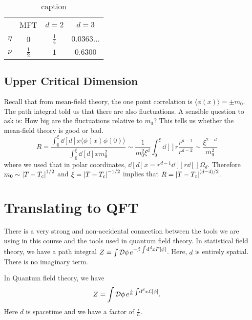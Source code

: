 \begin{table}[htpb]
  \centering
  \begin{tabular}{|c|c|c|c|}
     & MFT & $d = 2$ & $d = 3$ \\
    $\eta$ & 0 & $\frac{1}{4}$ & $0.0363\dots$ \\
    $\nu$ & $\frac{1}{2}$ & $1$ & $0.6300$ \\
  \end{tabular}
  \caption{caption}
  \label{tab:label}
\end{table}


\subsection{Upper Critical Dimension}%
\label{sub:upper_critical_dimension}

Recall that from mean-field theory, the one point correlation is $\langle \phi(x) \rangle = \pm m_0$. The path integral told us that there are also fluctuations. 
A sensible question to ask is: How big are the fluctuations relative to $m_0$?
This tells us whether the mean-field theory is good or bad.
\begin{equation}
  R = \frac{\int_{0}^{\xi} \dd[d]{x} \langle \phi(x)\phi(0) \rangle}{\int_{0}^{\xi} \dd[d]{x} m_0^2} \sim \frac{1}{m_0^2 \xi^d} \int_{0}^{\xi} \dd[]{r} \frac{r^{d-1}}{r^{d-2}} \sim \frac{\xi^{2-d}}{m_0^2}
\end{equation}
where we used that in polar coordinates, $\dd[d]{x} = r^{d-1} \dd[]{r} \dd[]{\Omega_d}$.
Therefore $m_0 \sim \abs{T - T_c}^{1/2}$ and $\xi = \abs{T - T_c}^{-1/2}$ implies that $R = \abs{T-T_c}^{(d-4)/2}$.

\section{Translating to QFT}%
\label{sec:translating_to_qft}

There is a very strong and non-accidental connection between the tools we are using in this course and the tools used in quantum field theory.
In statistical field theory, we have a path integral $Z = \int \mathop{\mathcal{D} \phi} e^{-\beta \int_{}^{} \dd[d]{x} F[\phi]}$. Here, $d$ is entirely spatial. There is no imaginary term.

In Quantum field theory, we have
\begin{equation}
  Z = \int \mathop{\mathcal{D} \phi} e^{\frac{i}{\hbar} \int \dd[d]{x} \mathcal{L}[\phi]}.
\end{equation}
Here $d$ is spacetime and we have a factor of $\frac{i}{\hbar}$.

